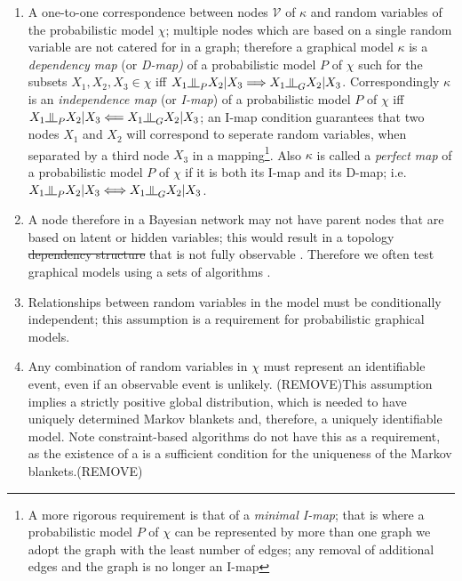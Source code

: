 \documentclass[7pt]{article}
\newcommand{\inperp}{\rotatebox[origin=c]{90}{$\models$}}
\begin{document}
\begin{enumerate}
	\item A one-to-one correspondence between nodes $\mathcal{V}$ of $\mathcal{\kappa}$ and random variables of the probabilistic model $\chi$; multiple nodes which are based on a single random variable are not catered for in a graph; therefore a graphical model $\mathcal{\kappa}$  is a \emph{dependency map} (or \emph{D-map)} of a probabilistic model $P$ of $\chi$ such for the subsets $X_1, X_2,X_3 \in \chi$ iff $X_1 \inperp_P X_2 | X_3 \Longrightarrow X_1 \inperp_G X_2 | X_3$. Correspondingly $\mathcal{\kappa}$ is an \emph {independence map} (or \emph{I-map}) of a probabilistic model $P$ of $\chi$ iff $X_1 \inperp_P X_2 | X_3 \Longleftarrow X_1 \inperp_G X_2 | X_3$; an I-map condition guarantees that two nodes $X_1$ and $X_2$ will correspond to seperate random variables, when separated by a third node $X_3$ in a mapping\footnote{A more rigorous requirement is that of a \emph{minimal I-map}; that is where a probabilistic model $P$ of $\chi$ can be represented by more than one graph we adopt the graph with the least number of edges; any removal of additional edges and the graph is no longer an I-map}.  Also $\mathcal{\kappa}$ is called a \emph{perfect map} of a probabilistic model $P$ of $\chi$ if it is both its I-map and its D-map; i.e. $X_1 \inperp_P X_2 | X_3 \Longleftrightarrow X_1 \inperp_G X_2 | X_3$. 
	\item A node therefore in a Bayesian network may not have parent nodes that are based on latent or hidden variables; this would result in a topology \st{dependency structure} that is not fully observable \cite{elidan2005learning, binder1997adaptive}. Therefore we often test graphical models using a sets of algorithms \cite{dempster1977maximum, friedman1997bayesian}.
	\item  Relationships between random variables in the model must be conditionally independent; this assumption is a requirement for probabilistic graphical models. 
	\item Any combination of random variables in $\chi$ must represent an identifiable event, even if an observable event is unlikely. {(REMOVE)This assumption implies a strictly positive global distribution, which is needed to have uniquely determined Markov blankets and, therefore, a uniquely identifiable model. Note constraint-based algorithms do not have this as a requirement, as the existence of a  is a sufficient condition for the uniqueness of the Markov blankets.(REMOVE)}
\end{enumerate}
\end{document}
